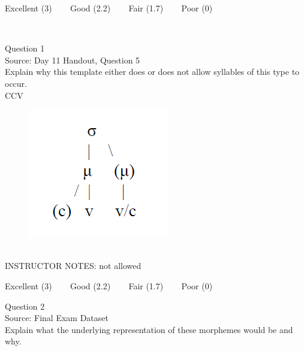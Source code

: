\documentclass[12pt]{article}
\begin{document}
\vfill
Excellent (3) ~~~ Good (2.2) ~~~ Fair (1.7) ~~~ Poor (0)
\newpage

\begin{center}
\textbf{{\color{red}{\HUGE END OF EXAM}}}\\

\end{center}
\newpage

\begin{center}
\textbf{{\color{blue}{\HUGE START OF EXAM\\}}}

\textbf{{\color{blue}{\HUGE Student ID: 3737\\}}}

\textbf{{\color{blue}{\HUGE 3:40 - 4:00 PM\\}}}

\end{center}
\newpage

{\large Question 1}\\

Source: Day 11 Handout, Question 5\\

Explain why this template either does or does not allow syllables of this type to occur.\\

CCV

\begin{figure}[H]
\includegraphics{../images/ponapean_syllabletemplate.png}
\end{figure}

~\\
INSTRUCTOR NOTES: not allowed


\vfill
Excellent (3) ~~~ Good (2.2) ~~~ Fair (1.7) ~~~ Poor (0)
\newpage

{\large Question 2}\\

Source: Final Exam Dataset\\

Explain what the underlying representation of these morphemes would be and why.\\
\end{document}
